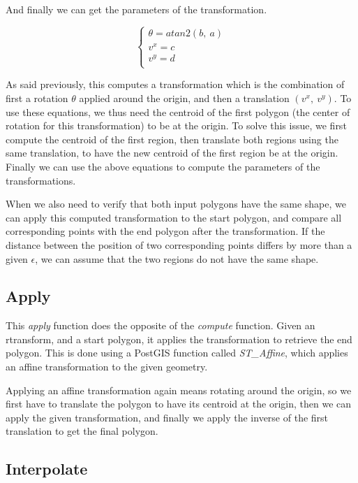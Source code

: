 And finally we can get the parameters of the transformation.

\[
    \begin{cases}
        \theta = atan2(b,\ a) \\
        v^x = c \\
        v^y = d \\
    \end{cases}
\]

As said previously, this computes a transformation which is the combination of first a rotation $\theta$ applied around the origin, and then a translation $(v^x,\ v^y)$. To use these equations, we thus need the centroid of the first polygon (the center of rotation for this transformation) to be at the origin. To solve this issue, we first compute the centroid of the first region, then translate both regions using the same translation, to have the new centroid of the first region be at the origin. Finally we can use the above equations to compute the parameters of the transformations.

When we also need to verify that both input polygons have the same shape, we can apply this computed transformation to the start polygon, and compare all corresponding points with the end polygon after the transformation. If the distance between the position of two corresponding points differs by more than a given $\epsilon$, we can assume that the two regions do not have the same shape.

\subsection{Apply}
\label{section:apply}

This \textit{apply} function does the opposite of the \textit{compute} function. Given an rtransform, and a start polygon, it applies the transformation to retrieve the end polygon. This is done using a PostGIS function called \textit{ST\_Affine}, which applies an affine transformation to the given geometry. 

Applying an affine transformation again means rotating around the origin, so we first have to translate the polygon to have its centroid at the origin, then we can apply the given transformation, and finally we apply the inverse of the first translation to get the final polygon.


\subsection{Interpolate}
\label{section:interpolate}

